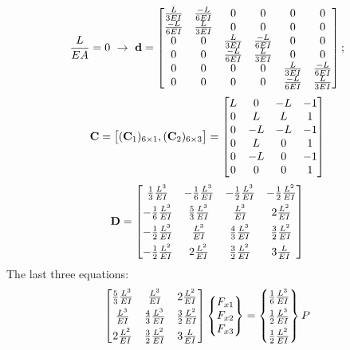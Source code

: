 \begin{example}[2D frame]
\begin{equation*}
  \frac{L}{EA} = 0\ \rightarrow\ \mathbf{d} =
  \begin{bmatrix}
    \frac{L}{3EI} & \frac{-L}{6EI} & 0 & 0 & 0 & 0\\
    \frac{-L}{6EI} & \frac{L}{3EI} & 0 & 0 & 0 & 0\\
    0 & 0 & \frac{L}{3EI} & \frac{-L}{6EI} & 0 & 0\\
    0 & 0 & \frac{-L}{6EI} & \frac{L}{3EI} & 0 & 0\\
    0 & 0 & 0 & 0 & \frac{L}{3EI} & \frac{-L}{6EI}\\
    0 & 0 & 0 & 0 & \frac{-L}{6EI} & \frac{L}{3EI}
  \end{bmatrix};
\end{equation*}
\begin{equation*}
  \mathbf{C} = \bigl[(\mathbf{C}_1)_{6\times1}, (\mathbf{C}_2)_{6\times3}\bigr] =
  \begin{bmatrix}
    L & 0 & -L & -1\\ 0 & L & L & 1\\ 0 & -L & -L & -1\\ 0 & L & 0 & 1\\ 0 & -L & 0 & -1\\ 0 & 0 & 0 & 1
  \end{bmatrix}
\end{equation*}
\begin{equation*}
  \mathbf{D} = \begin{bmatrix}
    \frac13\frac{L^3}{EI} & -\frac16\frac{L^3}{EI} & -\frac12\frac{L^3}{EI} & -\frac12\frac{L^2}{EI}\\[4pt]
    -\frac16\frac{L^3}{EI} & \frac53\frac{L^3}{EI} & \frac{L^3}{EI} & 2\frac{L^2}{EI}\\[4pt]
    -\frac12\frac{L^3}{EI} & \frac{L^3}{EI} & \frac43\frac{L^3}{EI} & \frac32\frac{L^2}{EI}\\[4pt]
    -\frac12\frac{L^2}{EI} & 2\frac{L^2}{EI} & \frac32\frac{L^2}{EI} & 3\frac{L}{EI}
  \end{bmatrix}
\end{equation*}
The last three equations:
\begin{equation*}
  \begin{bmatrix}
    \frac53\frac{L^3}{EI} & \frac{L^3}{EI} & 2\frac{L^2}{EI}\\[4pt]
    \frac{L^3}{EI} & \frac43\frac{L^3}{EI} & \frac32\frac{L^2}{EI}\\[4pt]
    2\frac{L^2}{EI} & \frac32\frac{L^2}{EI} & 3\frac{L}{EI}
  \end{bmatrix}\Bmat{F_{x1}\\ F_{x2}\\ F_{x3}} = \Bmat{\frac16\frac{L^3}{EI}\\[4pt] \frac12\frac{L^3}{EI}\\[4pt] \frac12\frac{L^2}{EI}}P

\end{equation*}
\end{example}
